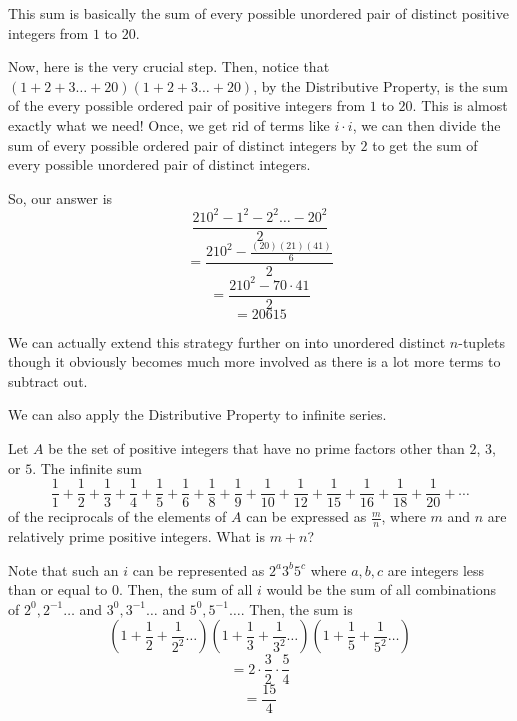 \documentclass[11pt]{article}
\begin{document}
\begin{sol}
This sum is basically the sum of every possible unordered pair of distinct positive integers from $1$ to $20$. 

Now, here is the very crucial step. Then, notice that $(1+2+3\ldots + 20)(1+2+3\ldots + 20)$, by the Distributive Property, is the sum of the every possible ordered pair of positive integers from $1$ to $20$. This is almost exactly what we need! Once, we get rid of terms like $i\cdot i$, we can then divide the sum of every possible ordered pair of distinct integers by $2$ to get the sum of every possible unordered pair of distinct integers.

So, our answer is 
$$\frac{210^2-1^2-2^2\ldots - 20^2}{2}$$
$$=\frac{210^2-\frac{(20)(21)(41)}{6}}{2}$$
$$=\frac{210^2-70\cdot 41}{2}$$
$$=\boxed{20615}$$
\end{sol}

We can actually extend this strategy further on into unordered distinct $n$-tuplets though it obviously becomes much more involved as there is a lot more terms to subtract out.

We can also apply the Distributive Property to infinite series.

\begin{exam}[2018 AMC 12A/18]
Let $A$ be the set of positive integers that have no prime factors other than $2$, $3$, or $5$. The infinite sum $$\frac{1}{1} + \frac{1}{2} + \frac{1}{3} + \frac{1}{4} + \frac{1}{5} + \frac{1}{6} + \frac{1}{8} + \frac{1}{9} + \frac{1}{10} + \frac{1}{12} + \frac{1}{15} + \frac{1}{16} + \frac{1}{18} + \frac{1}{20} + \cdots$$of the reciprocals of the elements of $A$ can be expressed as $\frac{m}{n}$, where $m$ and $n$ are relatively prime positive integers. What is $m+n$?
\end{exam}

\begin{sol}
Note that such an $i$ can be represented as $2^{a}3^{b}5^{c}$ where $a,b,c$ are integers less than or equal to $0$. Then, the sum of all $i$ would be the sum of all combinations of $2^{0},2^{-1}\ldots$ and $3^{0},3^{-1}\ldots$ and $5^{0},5^{-1}\ldots $. Then, the sum is 
$$(1+\frac{1}{2}+\frac{1}{2^2}\ldots)(1+\frac{1}{3}+\frac{1}{3^2}\ldots)(1+\frac{1}{5}+\frac{1}{5^2}\ldots)$$
$$=2\cdot \frac{3}{2}\cdot \frac{5}{4}$$
$$=\boxed{\frac{15}{4}}$$
\end{sol}

\end{document}
